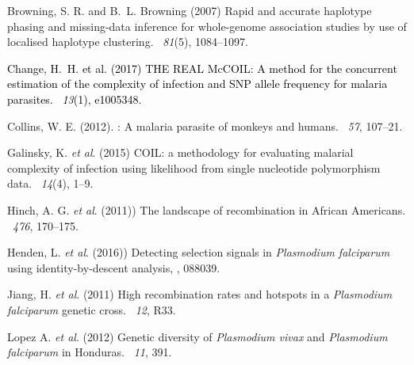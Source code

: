 \documentclass{article}
\begin{document}
\begin{thebibliography}{}

Browning, S. R. and B.~L. Browning (2007)
\newblock Rapid and accurate haplotype phasing and missing-data inference for
  whole-genome association studies by use of localised haplotype clustering.
~{\em 81\/}(5), 1084--1097.

\textcolor{black}{Change, H.~H. et al. (2017)
\newblock THE REAL McCOIL: A method for the concurrent estimation of the complexity of infection and SNP allele frequency for malaria parasites.
~{\em 13\/}(1), e1005348.}

Collins, W. E. (2012).
: A malaria parasite of monkeys and humans.
~{\em 57\/}, 107--21.

Galinsky, K. {\em et al}. (2015)
\newblock COIL: a methodology for evaluating malarial complexity of infection using likelihood from single nucleotide polymorphism data.
~{\em14\/}(4), 1--9.

Hinch, A. G. {\em et al}. (2011))
\newblock The landscape of recombination in African Americans.
~{\em 476}, 170--175.

Henden, L. {\em et al}. (2016))
\newblock Detecting selection signals in {\it Plasmodium falciparum} using identity-by-descent analysis,
, 088039.

Jiang, H. {\em et al}. (2011)
\newblock High recombination rates and hotspots in a {\it Plasmodium falciparum} genetic cross.
~{\em 12}, R33.

Lopez A. {\em et al}. (2012)
\newblock Genetic diversity of {\it Plasmodium vivax} and {\it Plasmodium falciparum} in Honduras.
~{\em 11}, 391.


\end{thebibliography}
\end{document}
